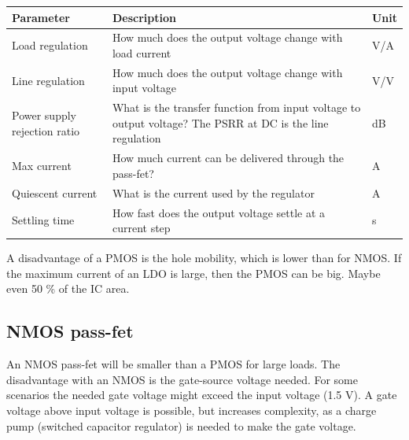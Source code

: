 \begin{longtable}[]{@{}
  >{\raggedright\arraybackslash}p{}
  >{\raggedright\arraybackslash}p{}
  >{\raggedleft\arraybackslash}p{}@{}}
\toprule\noalign{}
\begin{minipage}[b]{\linewidth}\raggedright
Parameter
\end{minipage} & \begin{minipage}[b]{\linewidth}\raggedright
Description
\end{minipage} & \begin{minipage}[b]{\linewidth}\raggedleft
Unit
\end{minipage} \\
\midrule\noalign{}
\endhead
\bottomrule\noalign{}
\endlastfoot
Load regulation & How much does the output voltage change with load
current & V/A \\
Line regulation & How much does the output voltage change with input
voltage & V/V \\
Power supply rejection ratio & What is the transfer function from input
voltage to output voltage? The PSRR at DC is the line regulation & dB \\
Max current & How much current can be delivered through the pass-fet? &
A \\
Quiescent current & What is the current used by the regulator & A \\
Settling time & How fast does the output voltage settle at a current
step & s \\
\end{longtable}

A disadvantage of a PMOS is the hole mobility, which is lower than for
NMOS. If the maximum current of an LDO is large, then the PMOS can be
big. Maybe even 50 \% of the IC area.

\subsection{NMOS pass-fet}\label{nmos-pass-fet}

An NMOS pass-fet will be smaller than a PMOS for large loads. The
disadvantage with an NMOS is the gate-source voltage needed. For some
scenarios the needed gate voltage might exceed the input voltage (1.5
V). A gate voltage above input voltage is possible, but increases
complexity, as a charge pump (switched capacitor regulator) is needed to
make the gate voltage.

